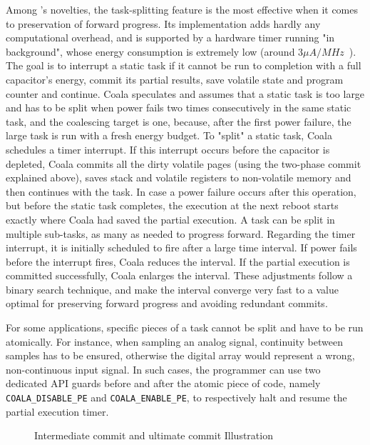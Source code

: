 Among \sys's novelties, the task-splitting feature is the most effective when it comes to preservation of forward progress. Its implementation adds hardly any computational overhead, and is supported by a hardware timer running "in background", whose energy consumption is extremely low (around $3 \mu A/MHz$~\cite{msp430datasheet}). The goal is to interrupt a static task if it cannot be run to completion with a full capacitor's energy, commit its partial results, save volatile state and program counter and continue. Coala speculates and assumes that a static task is too large and has to be split when power fails two times consecutively in the same static task, and the coalescing target is one, because, after the first power failure, the large task is run with a fresh energy budget. To "split" a static task, Coala schedules a timer interrupt. If this interrupt occurs before the capacitor is depleted, Coala commits all the dirty volatile pages (using the two-phase commit explained above), saves stack and volatile registers to non-volatile memory and then continues with the task. In case a power failure occurs after this operation, but before the static task completes, the execution at the next reboot starts exactly where Coala had saved the partial execution. A task can be split in multiple sub-tasks, as many as needed to progress forward. Regarding the timer interrupt, it is initially scheduled to fire after a large time interval. If power fails before the interrupt fires, Coala reduces the interval. If the partial execution is committed successfully, Coala enlarges the interval. These adjustments follow a binary search technique, and make the interval converge very fast to a value optimal for preserving forward progress and avoiding redundant commits.

For some applications, specific pieces of a task cannot be split and have to be run atomically. For instance, when sampling an analog signal, continuity between samples has to be ensured, otherwise the digital array would represent a wrong, non-continuous input signal. In such cases, the programmer can use two dedicated API guards before and after the atomic piece of code, namely \texttt{COALA\_DISABLE\_PE} and \texttt{COALA\_ENABLE\_PE}, to respectively halt and resume the partial execution timer.

\begin{wrapfigure}{t!}{0.5\textwidth}
	\centering
	\caption{Intermediate commit and ultimate commit Illustration }
	\label{fig:intermediate_ultimate-commit}
\end{wrapfigure}
